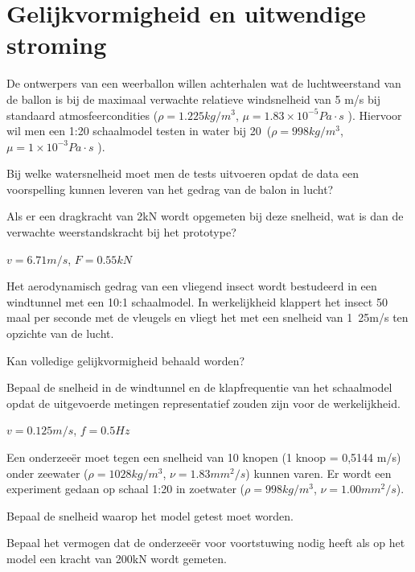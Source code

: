 \FloatBarrier
\chapter{Gelijkvormigheid en uitwendige stroming}
\label{sec:Gelijkvormigheid}
	\begin{toepassing*}
		\label{weerballon}
		De ontwerpers van een weerballon willen achterhalen wat de luchtweerstand van de ballon is bij de maximaal verwachte relatieve windsnelheid van 5 m/s bij standaard atmosfeercondities ($\rho = \unit{1.225}{kg/m^3}$, $\mu = \unit{1.83\times 10^{-5}}{Pa \cdot s}$ ).
		Hiervoor wil men een 1:20 schaalmodel testen in water bij 20\textcelsius\ ($\rho = \unit{998}{kg/m^3}$, $\mu = \unit{1\times 10^{-3}}{Pa \cdot s}$ ). 
		
		Bij welke watersnelheid moet men de tests uitvoeren opdat de data een voorspelling kunnen leveren van het gedrag van de balon in lucht? 
		
		Als er een dragkracht van \unit{2}{kN} wordt opgemeten bij deze snelheid, wat is dan de verwachte weerstandskracht bij het prototype?
	\end{toepassing*}
	\begin{antwoord}
		$v = \unit{6.71}{m/s}$, $F = \unit{0.55}{kN}$
	\end{antwoord}
	\begin{toepassing*}
		\label{insect}
		Het aerodynamisch gedrag van een vliegend insect wordt bestudeerd in een windtunnel met een 10:1 schaalmodel. In werkelijkheid klappert het insect 50 maal per seconde met de vleugels en vliegt het met een snelheid van \unit{1.25}{m/s} ten opzichte van de lucht. 
		
		Kan volledige gelijkvormigheid behaald worden?
		
		Bepaal de snelheid in de windtunnel en de klapfrequentie van het schaalmodel opdat de uitgevoerde metingen representatief zouden zijn voor de werkelijkheid.
	\end{toepassing*}
	\begin{antwoord}
		$v = \unit{0.125}{m/s}$, $f = \unit{0.5}{Hz}$
	\end{antwoord}
	\begin{toepassing*}	
		\label{onderzeeer}	
		Een onderzeeër moet tegen een snelheid van 10 knopen (1 knoop = 0,5144 m/s) onder zeewater ($\rho = \unit{1028}{kg/m^3}$, $\nu = \unit{1.83}{mm^2/s}$) kunnen varen. Er wordt een experiment gedaan op schaal 1:20 in zoetwater ($\rho = \unit{998}{kg/m^3}$, $\nu = \unit{1.00}{mm^2/s}$).
		
		Bepaal de snelheid waarop het model getest moet worden.
		
		Bepaal het vermogen dat de onderzeeër voor voortstuwing nodig heeft als op het model een kracht van \unit{200}{kN} wordt gemeten.
	\end{toepassing*}
